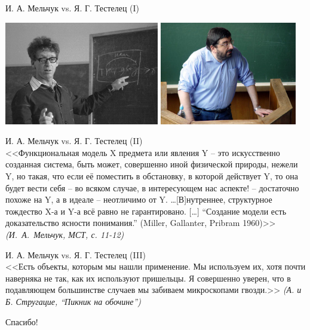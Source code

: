 \documentclass{beamer}
\begin{document}
\begin{frame}{И. А. Мельчук vs. Я. Г. Тестелец (I)}
\begin{center}
        \includegraphics[width=0.506\textwidth]{melcuk.jpg}
        \hfill
        \includegraphics[width=0.45\textwidth]{testelets.jpg}
\end{center}
\end{frame}

\begin{frame}{И. А. Мельчук vs. Я. Г. Тестелец (II)}
\ \\
{\small <<Функциональная модель X предмета или явления Y -- это искусственно созданная система, быть может, совершенно иной физической природы, нежели Y, но такая, что если её поместить в обстановку, в которой действует Y, то она будет вести себя -- во всяком случае, в интересующем нас аспекте! -- достаточно похоже на Y, а в идеале -- неотличимо от Y. \dots [В]нутреннее, структурное тождество X-а и Y-а всё равно не гарантировано. [\dots] ``Создание модели есть доказательство ясности понимания.'' (Miller, Gallanter, Pribram 1960)>> \textit{(И.~А.~Мельчук, МСТ, с. 11-12)}}\\
\end{frame}

\begin{frame}{И. А. Мельчук vs. Я. Г. Тестелец (III)}
\ \\
{\small <<Есть объекты, которым мы нашли применение. Мы используем их, хотя почти наверняка не так, как их используют пришельцы. Я совершенно уверен, что в подавляющем большинстве случаев мы забиваем микроскопами гвозди.>> \textit{(А. и Б. Стругацие, ``Пикник на обочине'')}}\\
\end{frame}


\begin{frame}{}
    \thispagestyle{empty}
    \begin{center}
        {\large Спасибо!}
    \end{center}
\end{frame}
\end{document}
